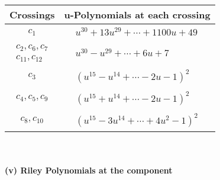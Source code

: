 \documentclass[1p]{elsarticle_modified}
\theoremstyle{definition}
\begin{document}
\begin{tabular}{m{50pt}|m{274pt}}
Crossings & \hspace{64pt}u-Polynomials at each crossing \\
\hline $$\begin{aligned}c_{1}\end{aligned}$$&$\begin{aligned}
&u^{30}+13 u^{29}+\cdots+1100 u+49
\end{aligned}$\\
\hline $$\begin{aligned}c_{2},c_{6},c_{7}\\c_{11},c_{12}\end{aligned}$$&$\begin{aligned}
&u^{30}- u^{29}+\cdots+6 u+7
\end{aligned}$\\
\hline $$\begin{aligned}c_{3}\end{aligned}$$&$\begin{aligned}
&(u^{15}- u^{14}+\cdots-2 u-1)^{2}
\end{aligned}$\\
\hline $$\begin{aligned}c_{4},c_{5},c_{9}\end{aligned}$$&$\begin{aligned}
&(u^{15}+u^{14}+\cdots-2 u-1)^{2}
\end{aligned}$\\
\hline $$\begin{aligned}c_{8},c_{10}\end{aligned}$$&$\begin{aligned}
&(u^{15}-3 u^{14}+\cdots+4 u^2-1)^{2}
\end{aligned}$\\
\hline
\end{tabular}\\~\\
\newpage\renewcommand{\arraystretch}{1}
\flushleft \textbf{(v) Riley Polynomials at the component}\newline \\
\end{document}
